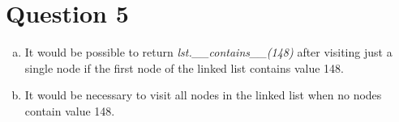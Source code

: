\documentclass[12pt]{article}
\begin{document}
\section*{Question 5}
\begin{enumerate}[a.]
    \item It would be possible to return \textit{lst.\_\_contains\_\_(148)}
    after visiting just a single node if the first node of the linked list contains
    value 148.
    \item It would be necessary to visit all nodes in the linked list when
    no nodes contain value 148.
\end{enumerate}
\end{document}
